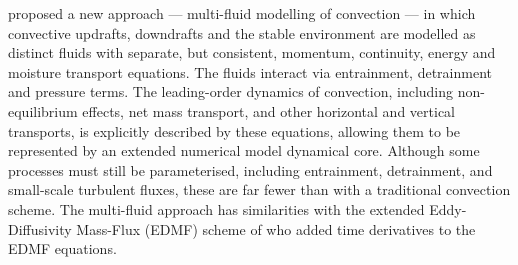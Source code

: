 \documentclass[11pt,a4paper]{article}
\begin{document}
\cite{TWV+18} proposed a new approach --- multi-fluid modelling of convection --- in which convective updrafts, downdrafts and the stable environment are modelled as distinct fluids with separate, but consistent, momentum, continuity, energy and moisture transport equations. The fluids interact via entrainment, detrainment and pressure terms. 
The leading-order dynamics of convection, including non-equilibrium effects, net mass transport, and other horizontal and vertical transports, is explicitly described by these equations, allowing them to be represented by
an extended numerical model dynamical core. Although some processes must still be parameterised, including entrainment,
detrainment, and small-scale turbulent fluxes, these are far fewer than with a traditional convection scheme.
The multi-fluid approach has similarities with the extended Eddy-Diffusivity Mass-Flux (EDMF) scheme of \cite{TKP+18} who added time derivatives to the EDMF equations.





\end{document}
